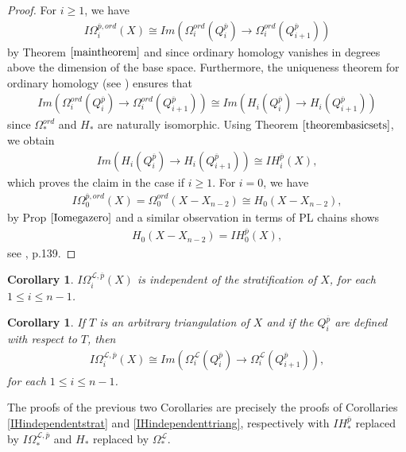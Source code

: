 \documentclass{scrreprt}
\newtheorem{corollar}[prop]{Corollary}
\begin{document}
\begin{proof}
For $i \geq 1$, we have 
\begin{align*}
 I\Omega_i^{\overline{p},ord}(X) \cong Im(\Omega_i^{ord}(Q_{i}^{\overline{p}}) \to \Omega_i^{ord}(Q_{i+1}^{\overline{p}}))
\end{align*}
by Theorem $\ref{maintheorem}$ and since ordinary homology vanishes in degrees above the dimension of the base space. Furthermore, the uniqueness theorem for ordinary homology (see \cite{ES}) ensures that
\begin{align*}
Im(\Omega_i^{ord}(Q_{i}^{\overline{p}}) \to \Omega_i^{ord}(Q_{i+1}^{\overline{p}})) \cong Im(H_i(Q_{i}^{\overline{p}}) \to H_i(Q_{i+1}^{\overline{p}}))
\end{align*}
since $\Omega_*^{ord}$ and $H_*$ are naturally isomorphic. Using Theorem $\ref{theorembasicsets}$, we obtain
\begin{align*}
Im(H_i(Q_{i}^{\overline{p}}) \to H_i(Q_{i+1}^{\overline{p}})) \cong IH_i^{\overline{p}}(X),
\end{align*}
which proves the claim in the case if $i \geq 1$. For $i=0$, we have
\begin{align*}
I\Omega_0^{\overline{p},ord}(X)=\Omega_0^{ord}(X-X_{n-2}) \cong H_0(X-X_{n-2}),
\end{align*}
by Prop $\ref{Iomegazero}$ and a similar observation in terms of PL chains shows 
\begin{align*}
 H_0(X-X_{n-2})=IH_0^{\overline{p}}(X),
\end{align*}
see \cite{GM}, p.139.
\end{proof}

\begin{corollar}\label{IOmegaindependentstrat}
$I\Omega_i^{\mathcal{L}, \overline{p}}(X)$ is independent of the stratification of $X$, for each $1 \leq i \leq n-1$.
\end{corollar}

\begin{corollar}
If $T$ is an arbitrary triangulation of $X$ and if the $Q_i^{\overline{p}}$ are defined with respect to $T$, then
\begin{align*}
I\Omega_i^{\mathcal{L}, \overline{p}}(X)\cong Im(\Omega_i^{\mathcal{L}}(Q_{i}^{\overline{p}}) \to \Omega_i^{\mathcal{L}}(Q_{i+1}^{\overline{p}})),
\end{align*}
for each $1 \leq i \leq n-1$.
\end{corollar}

The proofs of the previous two Corollaries are precisely the proofs of Corollaries \ref{IHindependentstrat} and \ref{IHindependenttriang}, respectively with $IH_*^{\overline{p}}$ replaced by $I\Omega_*^{\mathcal{L}, \overline{p}}$ and $H_*$ replaced by $\Omega_*^{\mathcal{L}}$.
\end{document}
